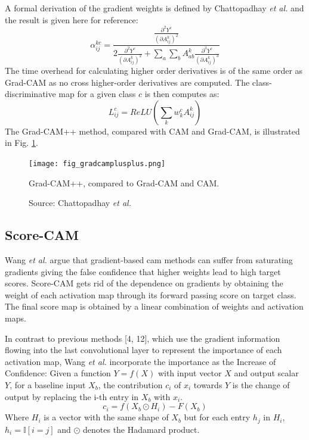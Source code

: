 A formal derivation of the gradient weights is defined by Chattopadhay \textit{et al.} \cite{chattopadhay2018grad} and the result is given here for reference:
\begin{equation}
    \alpha_{ij}^{kc} = \frac{\frac{\partial^{2}{Y^c}}{\left( \partial{A_{ij}^{k}} \right)^2}}{2\frac{\partial^{2}{Y^c}}{\left( \partial{A_{ij}^{k}} \right)^2} + \sum_a \sum_b A_{ab}^{k} {\frac{\partial^{3}{Y^c}}{\left( \partial{A_{ij}^{k}} \right)^3}} }
\end{equation}
The time overhead for calculating higher order derivatives is of the same order as Grad-CAM as no cross higher-order derivatives are computed. The class-discriminative map for a given class $c$ is then computes as:
\begin{equation}
    L_{ij}^{c} = ReLU \left( \sum_{k}w_{k}^{c} A_{ij}^{k} \right)
\end{equation}
The Grad-CAM++ method, compared with CAM and Grad-CAM, is illustrated in Fig. \ref{fig:gradcamplusplus}.
\begin{figure}[ht]
    \begin{center}       
    \texttt{[image: fig\_gradcamplusplus.png]}
    \caption[Grad-CAM++]{Grad-CAM++, compared to Grad-CAM and CAM.}
    \caption*{Source: Chattopadhay \textit{et al.} \cite{chattopadhay2018grad}}
    \label{fig:gradcamplusplus}
    \end{center}
\end{figure}

\subsection{Score-CAM}
Wang \textit{et al.} \cite{wang2020score} argue that gradient-based \acrshort{cam} methods can suffer from saturating gradients giving the false confidence that higher weights lead to high target scores. Score-CAM gets rid of the dependence on gradients by obtaining the weight of each activation map through its forward passing score on target class. The final score map is obtained by a linear combination of weights and activation maps.

In contrast to previous methods [4, 12], which use the gradient information flowing into the last convolutional layer to represent the importance of each activation map, Wang \textit{et al.} incorporate the importance as the Increase of Confidence: Given a function $Y = f(X)$ with input vector $X$ and output scalar $Y$, for a baseline input $X_b$, the contribution $c_i$ of $x_i$ towards $Y$ is the change of output by replacing the i-th entry in $X_b$ with $x_i$.
\begin{equation}
    c_i = f(X_b \odot H_i) - F(X_b)
\end{equation}
Where $H_i$ is a vector with the same shape of $X_b$ but for each entry $h_j$ in $H_i$, $h_i = \mathbb{I}[i=j]$ and $\odot$ denotes the Hadamard product.

